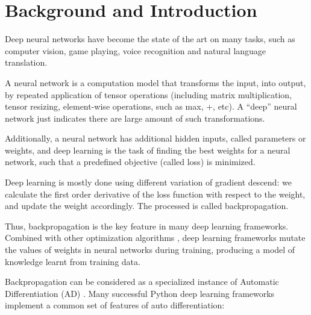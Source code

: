 
\section{Background and Introduction}

Deep neural networks have become the state of the art on many tasks, such as computer vision, game playing, voice recognition and natural language translation.

A neural network is a computation model that transforms the input, into output, by repeated application of tensor operations (including matrix multiplication, tensor resizing, element-wise operations, such as max, +, etc). A ``deep'' neural network just indicates there are large amount of such transformations.

Additionally, a neural network has additional hidden inputs, called parameters or weights, and deep learning is the task of finding the best weights for a neural network, such that a predefined objective (called loss) is minimized.

Deep learning is mostly done using different variation of gradient descend: we calculate the first order derivative of the loss function with respect to the weight, and update the weight accordingly. The processed is called backpropagation.

Thus, backpropagation \cite{rumelhart1985learning} is the key feature in many deep learning frameworks. Combined with other optimization algorithms \cite{kingma2014adam, zeiler2012adadelta,duchi2011adaptive}, deep learning frameworks mutate the values of weights in neural networks during training, producing a model of knowledge learnt from training data.

Backpropagation can be considered as a specialized instance of Automatic Differentiation (AD) \cite{baydin2015automatic}. Many successful Python deep learning frameworks \cite{tokui2015chainer,google2017eager,paszke2017pytorch,neubig2017dynet} implement a common set of features of auto differentiation:

